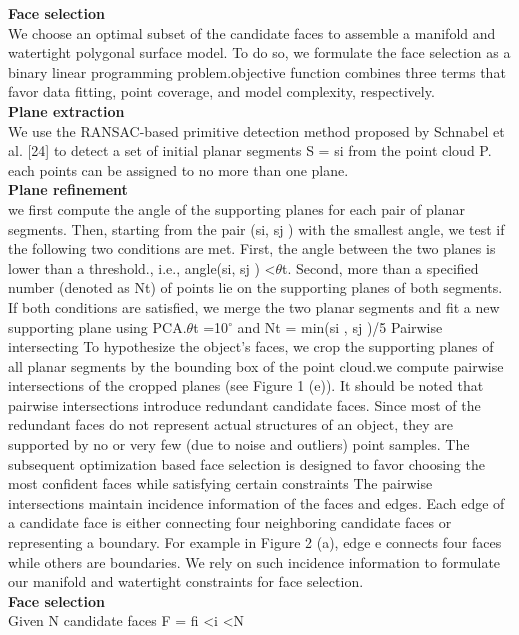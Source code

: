 \documentclass[12pt]{article}
\begin{document}
\begin{itemize}
{\textbf{Face selection}}\\ We choose an optimal subset of the candidate faces to assemble a manifold and watertight polygonal surface model. To do so, we formulate the face selection as a binary linear programming problem.objective function combines three terms that favor data fitting, point coverage, and model complexity, respectively.\\
{\textbf{Plane extraction}}\\ We use the RANSAC-based primitive detection method proposed by Schnabel et al. [24] to detect a set of initial planar segments S = {si} from the point cloud P.
each points can be assigned to no more than one plane.\\
{\textbf{Plane refinement}}\\ we first compute the angle of the supporting planes for each pair of planar segments. Then, starting from the pair (si, sj ) with the smallest angle, we test if the following two conditions are met. First, the angle between the two planes is lower than a threshold., i.e., angle(si, sj ) \textless $\theta$t. Second, more than a specified number (denoted as Nt) of points lie on the supporting planes of both segments. If both conditions are satisfied, we merge the two planar segments and fit a new supporting plane using PCA.$\theta$t =10$^{\circ}$ and Nt = min(\textbar si \textbar, \textbar sj \textbar)/5
Pairwise intersecting To hypothesize the object’s faces, we crop the supporting planes of all planar segments by the bounding box of the point cloud.we compute pairwise intersections of the cropped planes (see Figure 1 (e)). It should be noted that pairwise intersections introduce redundant candidate faces. Since most of the redundant faces do not represent actual structures of an object, they are supported by no or very few (due to noise and outliers) point samples. The subsequent optimization based face selection is designed to favor choosing the most confident faces while satisfying certain constraints
The pairwise intersections maintain incidence information of the faces and edges. Each edge of a candidate face is either connecting four neighboring candidate faces or representing a boundary. For example in Figure 2 (a), edge e connects four faces while others are boundaries. We rely on such incidence information to formulate our manifold and watertight constraints for face selection.\\
{\textbf{Face selection}}\\
Given N candidate faces F = {fi  \textless i \textless N}

\end{itemize}
\end{document}
